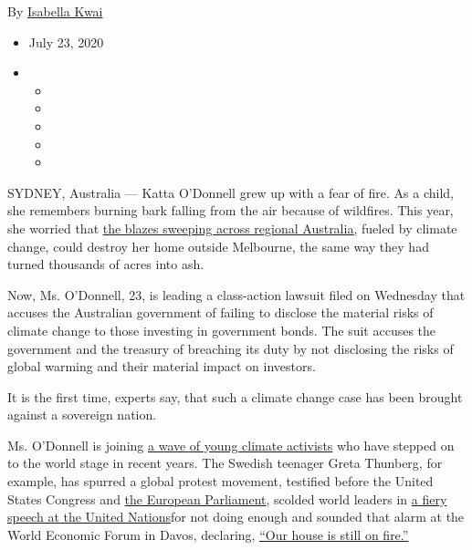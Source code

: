 By \href{https://www.nytimes3xbfgragh.onion/by/isabella-kwai}{Isabella
Kwai}

\begin{itemize}
\item
  July 23, 2020
\item
  \begin{itemize}
  \item
  \item
  \item
  \item
  \item
  \end{itemize}
\end{itemize}

SYDNEY, Australia --- Katta O'Donnell grew up with a fear of fire. As a
child, she remembers burning bark falling from the air because of
wildfires. This year, she worried that
\href{https://www.nytimes3xbfgragh.onion/2020/02/15/world/australia/fires-climate-change.html?searchResultPosition=2}{the
blazes sweeping across regional Australia,} fueled by climate change,
could destroy her home outside Melbourne, the same way they had turned
thousands of acres into ash.

Now, Ms. O'Donnell, 23, is leading a class-action lawsuit filed on
Wednesday that accuses the Australian government of failing to disclose
the material risks of climate change to those investing in government
bonds. The suit accuses the government and the treasury of breaching its
duty by not disclosing the risks of global warming and their material
impact on investors.

It is the first time, experts say, that such a climate change case has
been brought against a sovereign nation.

Ms. O'Donnell is joining
\href{https://www.nytimes3xbfgragh.onion/interactive/2020/07/21/magazine/teenage-activist-climate-change.html}{a
wave of young climate activists} who have stepped on to the world stage
in recent years. The Swedish teenager Greta Thunberg, for example, has
spurred a global protest movement, testified before the United States
Congress and
\href{https://www.nytimes3xbfgragh.onion/2020/03/04/world/europe/eu-climate-law-greta-thunberg.html?searchResultPosition=4}{the
European Parliament}, scolded world leaders in
\href{https://www.nytimes3xbfgragh.onion/2020/04/22/climate/earth-day-climate-coronavirus.html?searchResultPosition=2}{a
fiery speech at the United Nations}for not doing enough and sounded that
alarm at the World Economic Forum in Davos, declaring,
\href{https://www.nytimes3xbfgragh.onion/2020/01/21/climate/greta-thunberg-davos.html?searchResultPosition=9}{``Our
house is still on fire.''}

